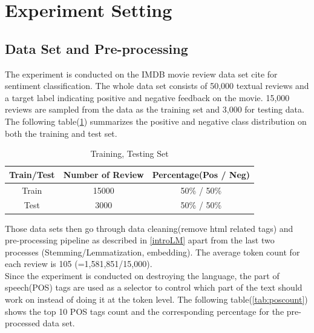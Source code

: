 \documentclass[12pt]{article}
\begin{document}
\newpage


\section{Experiment Setting} 

\subsection{Data Set and Pre-processing}
The experiment is conducted on the IMDB movie review data set {cite} for sentiment classification. The whole data set consists of 50,000 textual reviews and a target label indicating  positive and negative feedback on the movie. 15,000 reviews are sampled from the data as the training set and 3,000 for testing data. The following table(\ref{tab:dataset}) summarizes the positive and negative class distribution on both the training and test set.
\begin{table}[!h]
    \centering
        \begin{tabular}{||c|c| c||} 
        \hline
 Train/Test & Number of Review & Percentage(Pos / Neg) \\ 
 \hline\hline
 Train  &  15000  & 50\% / 50\% \\ 
 \hline
  Test & 3000  & 50\% / 50\%  \\ 
 \hline
    \end{tabular}
     \caption{Training, Testing Set}
    \label{tab:dataset}
\end{table} 

Those data sets then go through data cleaning(remove html related tags) and pre-processing pipeline as described in \ref{introLM} apart from the last two processes (Stemming/Lemmatization, embedding). The average token count for each review is 105 (=1,581,851/15,000). \\

Since the experiment is conducted on destroying the language, the part of speech(POS) tags are used as a selector to control which part of the text should work on instead of doing it at the token level. The following table(\ref{tab:poscount}) shows the top 10 POS tags count and the corresponding percentage  for the pre-processed data set.
\end{document}

